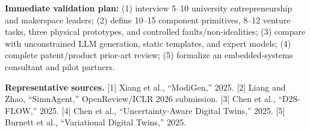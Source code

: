 \documentclass[a4paper,landscape]{article}
\begin{document}
\vspace{1.0mm}
\fontsize{6.45}{7.2}\selectfont
\begin{minipage}[t]{0.62\textwidth}
\colorbox{VMLight}{\parbox{0.985\linewidth}{
\textbf{Immediate validation plan:}
(1) interview 5--10 university entrepreneurship and makerspace leaders; 
(2) define 10--15 component primitives, 8--12 venture tasks, three physical prototypes, and controlled faults/non-idealities; 
(3) compare with unconstrained LLM generation, static templates, and expert models; 
(4) complete patent/product prior-art review; 
(5) formalize an embedded-systems consultant and pilot partners.
}}
\end{minipage}
\hfill
\begin{minipage}[t]{0.365\textwidth}
{\fontsize{5.35}{6.0}\selectfont\color{black!72}
\textbf{Representative sources.}
[1] Xiang et al., ``ModiGen,'' 2025.
[2] Liang and Zhao, ``SimuAgent,'' OpenReview/ICLR 2026 submission.
[3] Chen et al., ``D2S-FLOW,'' 2025.
[4] Chen et al., ``Uncertainty-Aware Digital Twins,'' 2025.
[5] Burnett et al., ``Variational Digital Twins,'' 2025.
}
\end{minipage}
\end{document}
